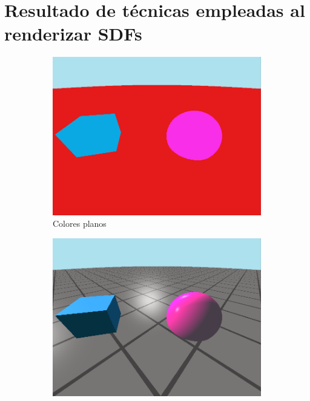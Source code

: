 
\chapter{Resultado de técnicas empleadas al renderizar SDFs}\label{ap:comparacionEscenas}

\begin{figure}[ht!]
    \centering
    \begin{subfigure}[b]{0.3\textwidth}
        \centering
        \includegraphics[width=\textwidth]{Plantilla-TFG-master/img/escena1_plana.png}
        \caption{Colores planos}
    \end{subfigure}
    \hfill
    \begin{subfigure}[b]{0.3\textwidth}
        \centering
        \includegraphics[width=\textwidth]{Plantilla-TFG-master/img/escena2_blinn.png}

\end{subfigure}
\end{figure}
